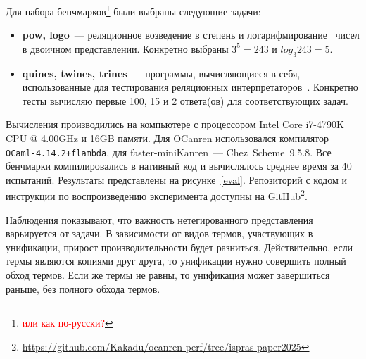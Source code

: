 \FloatBarrier

Для набора бенчмарков\footnote{\textcolor{red}{или как по-русски?}} были выбраны следующие задачи:

\begin{itemize}
\item \textbf{pow, logo}~--- реляционное возведение в степень и логарифмирование~\cite{KiselyovArithm} чисел в двоичном представлении.
Конкретно выбраны $3^5=243$ и $log_3 243=5$.
\item \textbf{quines, twines, trines}~--- программы, вычисляющиеся в себя, использованные для тестирования реляционных интерпретаторов~\cite{Untagged}.
Конкретно тесты вычисляю первые 100, 15 и 2 ответа(ов) для соответствующих задач.
\end{itemize}


Вычисления производились на компьютере с процессором Intel Core i7-4790K CPU @ 4.00GHz и 16GB памяти.
Для OCanren использовался компилятор \texttt{OCaml-4.14.2+flambda}, для faster-miniKanren~--- Chez~Scheme~9.5.8.
Все бенчмарки компилировались в нативный код и вычислялось среднее время за 40 испытаний.
Результаты представлены на рисунке~\ref{eval}.
Репозиторий с кодом и инструкции по воспроизведению эксперимента доступны на GitHub\footnote{\url{https://github.com/Kakadu/ocanren-perf/tree/ispras-paper2025}}.

Наблюдения показывают, что важность нетегированного представления варьируется от задачи.
В зависимости от видов термов, участвующих в унификации, прирост производительности будет разниться.
Действительно, если термы являются копиями друг друга, то унификации нужно совершить полный обход термов. Если же термы не равны, то унификация может завершиться раньше, без полного обхода термов.

